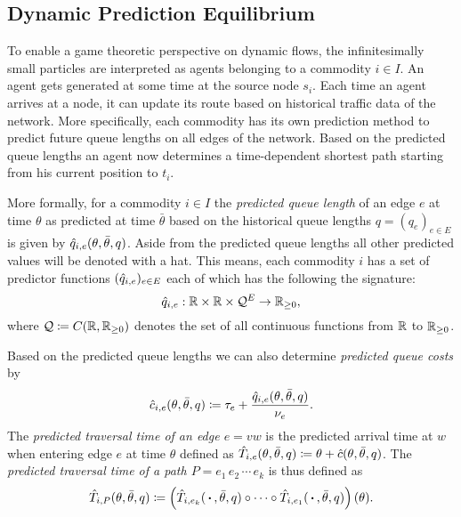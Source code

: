 \subsection{Dynamic Prediction Equilibrium}\label{subsec-dynamic-prediction-equilibrium}

To enable a game theoretic perspective on dynamic flows, the infinitesimally small particles are interpreted as agents belonging to a commodity $i\in I$.
An agent gets generated at some time at the source node $s_i$.
Each time an agent arrives at a node, it can update its route based on historical traffic data of the network.
More specifically, each commodity has its own prediction method to predict future queue lengths on all edges of the network.
Based on the predicted queue lengths an agent now determines a time-dependent shortest path starting from his current position to $t_i$.

More formally, for a commodity $i\in I$ the \emph{predicted queue length} of an edge $e$ at time $\theta$ as predicted at time $\bar\theta$ based on the historical queue lengths $q=(q_e)_{e\in E}$ is given by $\hat q_{i,e}(\theta, \bar\theta, q)$.
Aside from the predicted queue lengths all other predicted values will be denoted with a hat. 
This means, each commodity $i$ has a set of predictor functions $(\hat q_{i,e})_{e\in E}$ each of which has the following the signature:
\[
    \hat q_{i,e} : \mathbb{R} \times \mathbb{R} \times \mathcal{Q}^E \rightarrow \mathbb{R}_{\geq0},
\]
where $\mathcal{Q}\coloneqq {C}{\left({\mathbb{R}},{\mathbb{R}_{\geq0}}\right)}$ denotes the set of all continuous functions from $\mathbb{R}$ to $\mathbb{R}_{\geq0}$.

Based on the predicted queue lengths we can also determine \emph{predicted queue costs} by \[
    \hat c_{i,e}(\theta, \bar\theta, q) \coloneqq \tau_e + \frac{\hat q_{i,e}(\theta, \bar\theta, q)}{\nu_e}.
\]
The \emph{predicted traversal time of an edge $e=vw$} is the predicted arrival time at $w$ when entering edge $e$ at time $\theta$ defined as $\hat T_{i,e}(\theta, \bar\theta, q) \coloneqq \theta + \hat c(\theta, \bar\theta, q)$.
The \emph{predicted traversal time of a path $P=e_1\,e_2\,\cdots\,e_k$} is thus defined as \[
    \hat T_{i,P}(\theta,\bar\theta, q) \coloneqq \left(
        \hat T_{i,e_k}(\,\boldsymbol{\cdot}\,, \bar\theta, q) \circ \cdots \circ \hat T_{i,e_1}(\,\boldsymbol{\cdot}\,, \bar\theta, q)
    \right) (\theta).
\]

